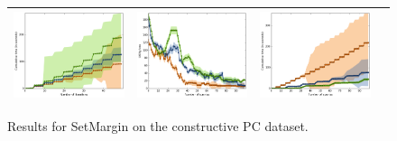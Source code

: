 \documentclass{article}
\renewcommand\[{\begin{equation}}
\renewcommand\]{\end{equation}}
\begin{document}
\begin{figure}
{\begin{tabular}{cccc}
        \includegraphics[width=10em]{figures/pc_with_costs_normal_sparse_per_iter_time} &
        \includegraphics[width=10em]{figures/pc_with_costs_normal_sparse_per_query_loss} &
        \includegraphics[width=10em]{figures/pc_with_costs_normal_sparse_per_query_time}
        \\
        \hline
    \end{tabular}
    }
    \caption{\label{fig:pc} Results for {\sc SetMargin} on the constructive PC
    dataset.}
\end{figure}
\end{document}
